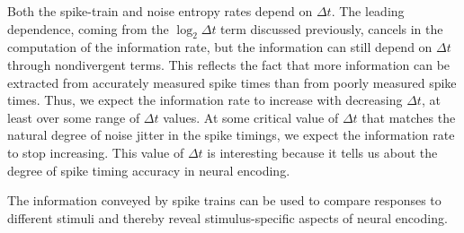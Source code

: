 \begin{rem}
  Both the spike-train and noise entropy rates depend on $\Delta t$. The leading dependence, coming from the $\log_{2}\Delta t$ term discussed previously, cancels in the computation of the information rate, but the information can still depend on $\Delta t$ through nondivergent terms. This reflects the fact that more information can be extracted from accurately measured spike times than from poorly measured spike times. Thus, we expect the information rate to increase with decreasing $\Delta t$, at least over some range of $\Delta t$ values.  At some critical value of $\Delta t$ that matches the natural degree of noise jitter in the spike timings, we expect the information rate to stop increasing. This value of $\Delta t$ is interesting because it tells us about the degree of spike timing accuracy in neural encoding.
\end{rem}

\begin{rem}
  The information conveyed by spike trains can be used to compare responses to different stimuli and thereby reveal stimulus-specific aspects of neural encoding.
\end{rem}


 



